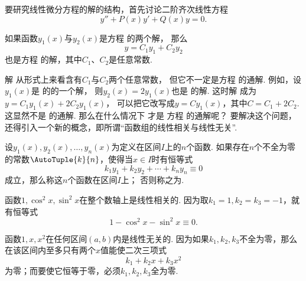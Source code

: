 要研究线性微分方程的解的结构，首先讨论二阶齐次线性方程\begin{equation}\label{equation:微分方程.二阶齐次线性微分方程的一般形式}
y'' + P(x) y' + Q(x) y = 0.
\end{equation}

\begin{theorem}
如果函数\(y_1(x)\)与\(y_2(x)\)是方程  的两个解，
那么
\begin{equation}\label{equation:微分方程.二阶齐次线性微分方程的通解的结构}
y = C_1 y_1 + C_2 y_2
\end{equation}
也是方程  的解，其中\(C_1\)、\(C_2\)是任意常数.
\end{theorem}

解  从形式上来看含有\(C_1\)与\(C_2\)两个任意常数，
但它不一定是方程  的通解.
例如，设\(y_1(x)\)是  的的一个解，
则\(y_2(x)=2 y_1(x)\)也是  的解.
这时解  成为\(y = C_1 y_1(x) + 2 C_2 y_1(x)\)，
可以把它改写成\(y = C y_1(x)\)，其中\(C = C_1 + 2 C_2\).
这显然不是  的通解.
那么在什么情况下  才是%
方程  的通解呢？
要解决这个问题，还得引入一个新的概念，即所谓“函数组的线性相关与线性无关”.

\begin{definition}
设\(y_1(x),y_2(x),\dotsc,y_n(x)\)为定义在区间\(I\)上的\(n\)个函数.
如果存在\(n\)个不全为零的常数\(\AutoTuple{k}{n}\)，使得当\(x \in I\)时有恒等式\[
k_1 y_1+k_2 y_2+ \dotsb +k_n y_n \equiv 0
\]成立，那么称这\(n\)个函数在区间\(I\)上；
否则称之为.
\end{definition}

\begin{example}
函数\(1,\cos^2 x, \sin^2 x\)在整个数轴上是线性相关的.
因为取\(k_1=1,k_2=k_3=-1\)，就有恒等式\[
1 - \cos^2 x - \sin^2 x \equiv 0.
\]

函数\(1,x,x^2\)在任何区间\((a,b)\)内是线性无关的.
因为如果\(k_1,k_2,k_3\)不全为零，那么在该区间内至多只有两个\(x\)值能使二次三项式\[
k_1 + k_2 x + k_3 x^2
\]为零；而要使它恒等于零，必须\(k_1,k_2,k_3\)全为零.
\end{example}

